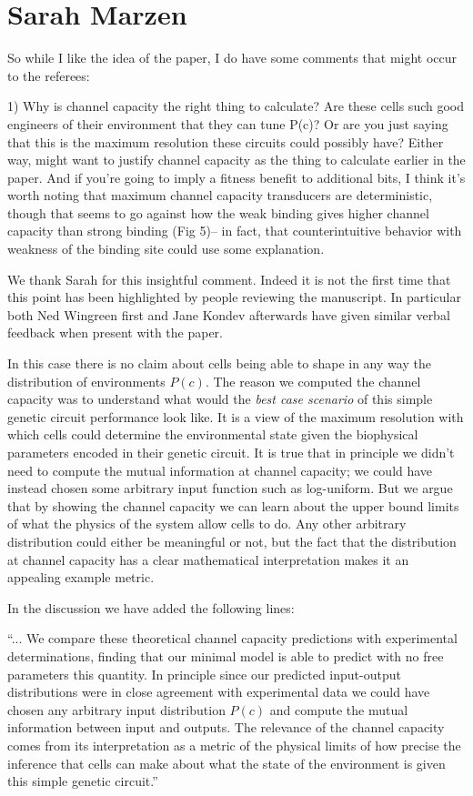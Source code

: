 \section{Sarah Marzen}

So while I like the idea of the paper, I do have some comments that might occur
to the referees:

\begin{tcolorbox}
1)  Why is channel capacity the right thing to calculate?  Are these cells such
good engineers of their environment that they can tune P(c)?  Or are you just
saying that this is the maximum resolution these circuits could possibly have?
Either way, might want to justify channel capacity as the thing to calculate
earlier in the paper.  And if you're going to imply a fitness benefit to
additional bits, I think it's worth noting that maximum channel capacity
transducers are deterministic, though that seems to go against how the weak
binding gives higher channel capacity than strong binding (Fig 5)-- in fact,
that counterintuitive behavior with weakness of the binding site could use some
explanation.
\end{tcolorbox}
We thank Sarah for this insightful comment. Indeed it is not the first time that
this point has been highlighted by people reviewing the manuscript. In
particular both Ned Wingreen first and Jane Kondev afterwards have given similar
verbal feedback when present with the paper.

In this case there is no claim about cells being able to shape in any way the
distribution of environments $P(c)$. The reason we computed the channel
capacity was to understand what would the \textit{best case scenario} of this
simple genetic circuit performance look like. It is a view of the maximum
resolution with which cells could determine the environmental state given the
biophysical parameters encoded in their genetic circuit. It is true that in
principle we didn't need to compute the mutual information at channel capacity;
we could have instead chosen some arbitrary input function such as log-uniform.
But we argue that by showing the channel capacity we can learn about the upper
bound limits of what the physics of the system allow cells to do. Any other
arbitrary distribution could either be meaningful or not, but the fact that the
distribution at channel capacity has a clear mathematical interpretation
makes it an appealing example metric.

In the discussion we have added the following lines:

``... We compare these theoretical channel capacity predictions with
experimental determinations, finding that our minimal model is able to predict
with no free parameters this quantity. In principle since our predicted
input-output distributions were in close agreement with experimental data we
could have chosen any arbitrary input distribution $P(c)$ and compute the mutual
information between input and outputs. The relevance of the channel capacity
comes from its interpretation as a metric of the physical limits of how precise
the inference that cells can make about what the state of the environment is
given this simple genetic circuit.''

